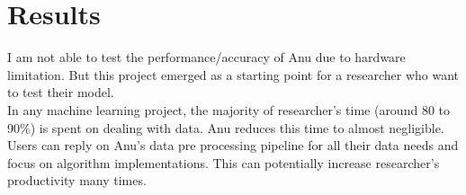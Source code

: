 \documentclass[../main.tex]{subfiles}
\begin{document}
\section{Results}
I am not able to test the performance/accuracy of Anu due to hardware limitation. But this project
emerged as a starting point for a researcher who want to test their model.\\
In any machine learning project, the majority of researcher's time (around 80 to 90\%)
is spent on dealing with data. Anu reduces this time to almost negligible. Users can reply
on Anu's data pre processing pipeline for all their data needs and focus on algorithm implementations.
This can potentially increase researcher's productivity many times.
\end{document}
